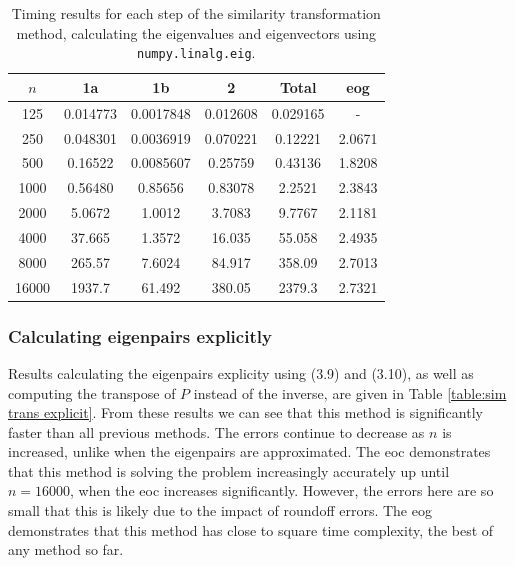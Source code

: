 \documentclass[11pt]{article}
\numberwithin{equation}{section}
\begin{document}
\begin{table}[H]
\centering
\begin{tabular}{|c|c|c|c|c|c|}
\hline
$n$ & 1a & 1b & 2 & Total & eog \\
\hline
125 & 0.014773 & 0.0017848 & 0.012608 & 0.029165 & - \\
250 & 0.048301 & 0.0036919 & 0.070221 & 0.12221 & 2.0671 \\
500 & 0.16522 & 0.0085607 &  0.25759 & 0.43136 & 1.8208 \\
1000 & 0.56480 & 0.85656 & 0.83078 & 2.2521 & 2.3843 \\
2000 & 5.0672 & 1.0012 & 3.7083 & 9.7767 & 2.1181 \\
4000 & 37.665 & 1.3572 & 16.035 & 55.058 & 2.4935 \\
8000 & 265.57 & 7.6024 & 84.917 & 358.09 & 2.7013 \\
16000 & 1937.7 & 61.492 & 380.05 & 2379.3 & 2.7321 \\
\hline
\end{tabular}
\captionsetup{justification=centering}
\caption{Timing results for each step of the similarity transformation method, calculating the eigenvalues and eigenvectors using \texttt{numpy.linalg.eig}.}
\label{table:sim trans numpy steps}
\end{table}

\subsubsection*{Calculating eigenpairs explicitly}
Results calculating the eigenpairs explicity using (3.9) and (3.10), as well as computing the transpose of $P$ instead of the inverse, are given in Table \ref{table:sim trans explicit}. From these results we can see that this method is significantly faster than all previous methods. The errors continue to decrease as $n$ is increased, unlike when the eigenpairs are approximated. The eoc demonstrates that this method is solving the problem increasingly accurately up until $n=16000$, when the eoc increases significantly. However, the errors here are so small that this is likely due to the impact of roundoff errors. The eog demonstrates that this method has close to square time complexity, the best of any method so far.
\end{document}
